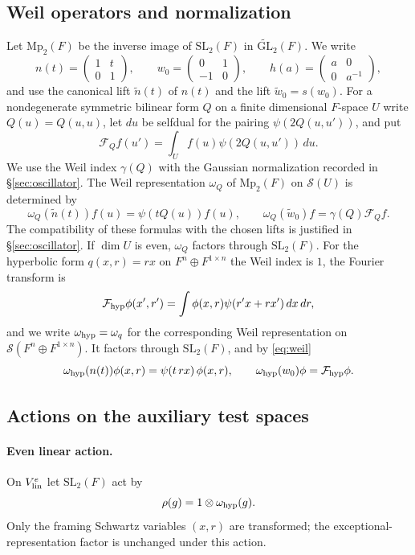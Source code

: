\documentclass[11pt,oneside,notitlepage]{book}
\numberwithin{equation}{section}
\theoremstyle{plain}
\theoremstyle{definition}
\newcommand{\GL}{\mathrm{GL}}
\newcommand{\SL}{\mathrm{SL}}
\newcommand{\Mp}{\mathrm{Mp}}
\newcommand{\cS}{\mathcal{S}}
\newcommand{\tGL}{\widetilde{\GL}}
\begin{document}
\subsection*{Weil operators and normalization}
Let $\Mp_2(F)$ be the inverse image of $\SL_2(F)$ in $\tGL_2(F)$. We write
\[n(t)=\begin{pmatrix}1&t\\0&1\end{pmatrix},\qquad w_0=\begin{pmatrix}0&1\\-1&0\end{pmatrix},\qquad h(a)=\begin{pmatrix}a&0\\0&a^{-1}\end{pmatrix},\]
and use the canonical lift $\tilde n(t)$ of $n(t)$ and the lift $\tilde w_0=s(w_0)$. For a nondegenerate symmetric bilinear form $Q$ on a finite dimensional $F$-space $U$ write $Q(u)=Q(u,u)$, let $du$ be selfdual for the pairing $\psi(2Q(u,u'))$, and put
\[\mathcal F_Qf(u')=\int_Uf(u)\psi(2Q(u,u'))\,du .\]
We use the Weil index $\gamma(Q)$ with the Gaussian normalization recorded in \S\ref{sec:oscillator}.
The Weil representation $\omega_Q$ of $\Mp_2(F)$ on $\cS(U)$ is determined by
\begin{equation}\label{eq:weil}
\omega_Q(\tilde n(t))f(u)=\psi(tQ(u))f(u),\qquad\omega_Q(\tilde w_0)f=\gamma(Q)\mathcal F_Qf .
\end{equation}
The compatibility of these formulas with the chosen lifts is justified in \S\ref{sec:oscillator}. If $\dim U$ is even, $\omega_Q$ factors through $\SL_2(F)$. For the hyperbolic form $q(x,r)=rx$ on $F^n\oplus F^{1\times n}$ the Weil index is $1$, the Fourier transform is
\[\mathcal F_{\rm hyp}\phi(x',r')=\int\phi(x,r)\psi(r'x+rx')\,dx\,dr,\]
and we write $\omega_{\rm hyp}=\omega_q$ for the corresponding Weil representation on $\cS(F^n\oplus F^{1\times n})$. It factors through $\SL_2(F)$, and by \eqref{eq:weil}
\[\omega_{\rm hyp}(n(t))\phi(x,r)=\psi(t\,rx)\,\phi(x,r),\qquad \omega_{\rm hyp}(w_0)\phi=\mathcal F_{\rm hyp}\phi .\]

\subsection*{Actions on the auxiliary test spaces}

\paragraph{Even linear action.} On $V^e_{\rm lin}$ let $\SL_2(F)$ act by
\[
 \rho(g)=1\otimes\omega_{\rm hyp}(g).
\]
Only the framing Schwartz variables $(x,r)$ are transformed; the exceptional-representation factor is unchanged under this action.
\end{document}
